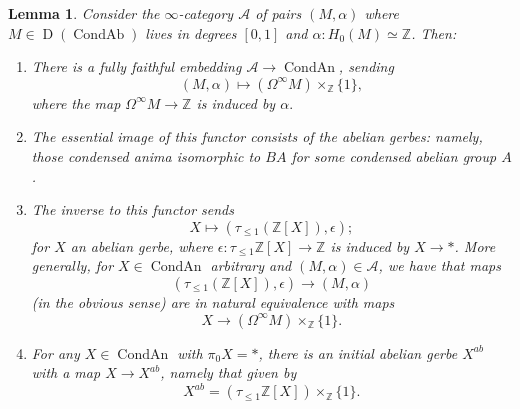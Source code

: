\documentclass[12pt]{article}
\newtheorem{lemma}[theorem]{Lemma}
\theoremstyle{definition}
\newcommand{\on}{\operatorname}
\newcommand{\mc}{\mathcal}
\newcommand{\mbb}{\mathbb}
\begin{document}
\begin{lemma}\label{gerbe}
Consider the $\infty$-category $\mc{A}$ of pairs $(M,\alpha)$ where $M\in\on{D}(\on{CondAb})$ lives in degrees $[0,1]$ and $\alpha:H_0(M)\simeq\mbb{Z}$.  Then:
\begin{enumerate}
\item There is a fully faithful embedding $\mc{A} \to \on{CondAn}$, sending
$$(M,\alpha) \mapsto (\Omega^\infty M)\times_{\mbb{Z}} \{1\},$$
where the map $\Omega^\infty M\to\mbb{Z}$ is induced by $\alpha.$
\item The essential image of this functor consists of the \emph{abelian gerbes}: namely, those condensed anima isomorphic to $BA$ for some condensed abelian group $A$.
\item The inverse to this functor sends
$$X\mapsto (\tau_{\leq 1}(\mbb{Z}[X]),\epsilon);$$
for $X$ an abelian gerbe, where $\epsilon:\tau_{\leq 1}\mbb{Z}[X] \to \mbb{Z}$ is induced by $X\to \ast$.  More generally, for $X\in\on{CondAn}$ arbitrary and $(M,\alpha)\in\mc{A}$, we have that maps
$$(\tau_{\leq 1}(\mbb{Z}[X]),\epsilon) \to (M,\alpha)$$
(in the obvious sense) are in natural equivalence with maps
$$X \to (\Omega^\infty M)\times_{\mbb{Z}} \{1\}.$$
\item For any $X\in\on{CondAn}$ with $\pi_0X=\ast$, there is an initial abelian gerbe $X^{ab}$ with a map $X\to X^{ab}$, namely that given by
$$X^{ab} = (\tau_{\leq 1}\mbb{Z}[X])\times_{\mbb{Z}}\{1\}.$$
\end{enumerate}
\end{lemma}
\end{document}
